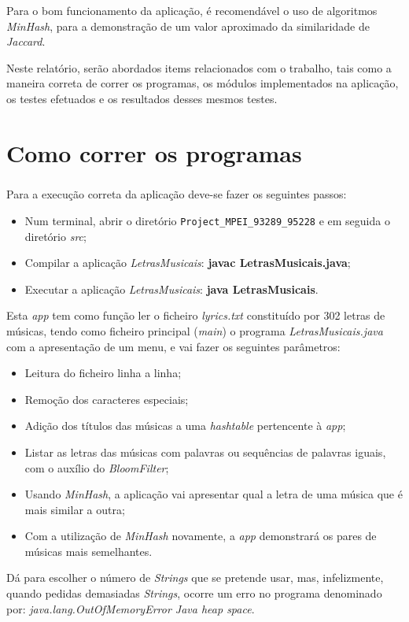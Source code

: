 \documentclass{report}
\begin{document}
Para o bom funcionamento da aplicação, é recomendável o uso de algoritmos \textit{MinHash}, para a demonstração de um valor aproximado da similaridade de \textit{Jaccard}.

Neste relatório, serão abordados items relacionados com o trabalho, tais como a maneira correta de correr os programas, os módulos implementados na aplicação, os testes efetuados e os resultados desses mesmos testes.


\chapter{Como correr os programas}
\label{chap.programas}

\paragraph{}
Para a execução correta da aplicação deve-se fazer os seguintes passos:

\begin{itemize}
	\item Num terminal, abrir o diretório \texttt{Project\_MPEI\_93289\_95228} e em seguida o diretório \textit{src};
	
	\item Compilar a aplicação \textit{LetrasMusicais}: \textbf{javac LetrasMusicais.java};
	
	\item Executar a aplicação \textit{LetrasMusicais}: \textbf{java LetrasMusicais}.
\end{itemize}

Esta \textit{app} tem como função ler o ficheiro \textit{lyrics.txt} constituído por 302 letras de músicas, tendo como ficheiro principal (\textit{main}) o programa \textit{LetrasMusicais.java} com a apresentação de um menu, e vai fazer os seguintes parâmetros:
\begin{itemize}
	\item Leitura do ficheiro linha a linha;
	\item Remoção dos caracteres especiais;
	\item Adição dos títulos das músicas a uma \textit{hashtable} pertencente à \textit{app};
	\item Listar as letras das músicas com palavras ou sequências de palavras iguais, com o auxílio do \textit{BloomFilter};
	\item Usando \textit{MinHash}, a aplicação vai apresentar qual a letra de uma música que é mais similar a outra;
	\item Com a utilização de \textit{MinHash} novamente, a \textit{app} demonstrará os pares de músicas mais semelhantes.
\end{itemize}
Dá para escolher o número de \textit{Strings} que se pretende usar, mas, infelizmente, quando pedidas demasiadas \textit{Strings}, ocorre um erro no programa denominado por: \textit{java.lang.OutOfMemoryError Java heap space}.
\end{document}
